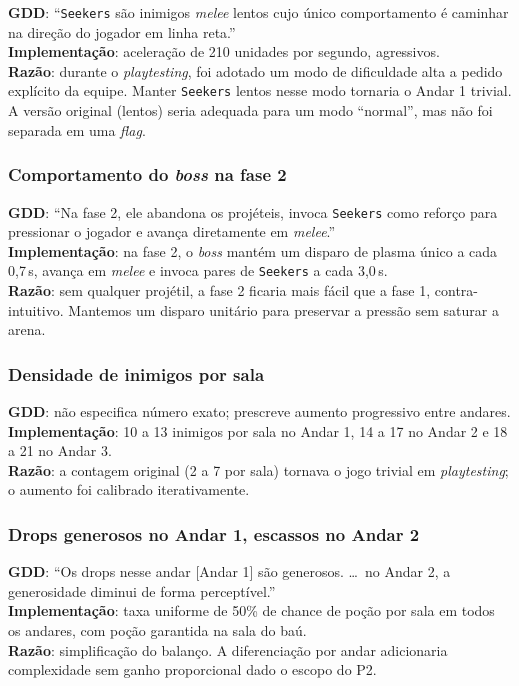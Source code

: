 \textbf{GDD}: ``\texttt{Seekers} são inimigos \emph{melee} lentos cujo único
comportamento é caminhar na direção do jogador em linha reta.''\\
\textbf{Implementação}: aceleração de 210 unidades por segundo, agressivos.\\
\textbf{Razão}: durante o \emph{playtesting}, foi adotado um modo de dificuldade
alta a pedido explícito da equipe. Manter \texttt{Seekers} lentos nesse modo
tornaria o Andar 1 trivial. A versão original (lentos) seria adequada para um
modo ``normal'', mas não foi separada em uma \emph{flag}.

\subsubsection*{Comportamento do \emph{boss} na fase 2}

\textbf{GDD}: ``Na fase 2, ele abandona os projéteis, invoca \texttt{Seekers} como
reforço para pressionar o jogador e avança diretamente em \emph{melee}.''\\
\textbf{Implementação}: na fase 2, o \emph{boss} mantém um disparo de plasma único
a cada 0,7\,s, avança em \emph{melee} e invoca pares de \texttt{Seekers} a cada
3,0\,s.\\
\textbf{Razão}: sem qualquer projétil, a fase 2 ficaria mais fácil que a fase 1,
contra-intuitivo. Mantemos um disparo unitário para preservar a pressão
sem saturar a arena.

\subsubsection*{Densidade de inimigos por sala}

\textbf{GDD}: não especifica número exato; prescreve aumento progressivo entre
andares.\\
\textbf{Implementação}: 10 a 13 inimigos por sala no Andar 1, 14 a 17 no Andar 2
e 18 a 21 no Andar 3.\\
\textbf{Razão}: a contagem original (2 a 7 por sala) tornava o jogo trivial em
\emph{playtesting}; o aumento foi calibrado iterativamente.

\subsubsection*{Drops generosos no Andar 1, escassos no Andar 2}

\textbf{GDD}: ``Os drops nesse andar [Andar 1] são generosos. \dots\ no Andar 2,
a generosidade diminui de forma perceptível.''\\
\textbf{Implementação}: taxa uniforme de 50\% de chance de poção por sala em
todos os andares, com poção garantida na sala do baú.\\
\textbf{Razão}: simplificação do balanço. A diferenciação por andar adicionaria
complexidade sem ganho proporcional dado o escopo do P2.

